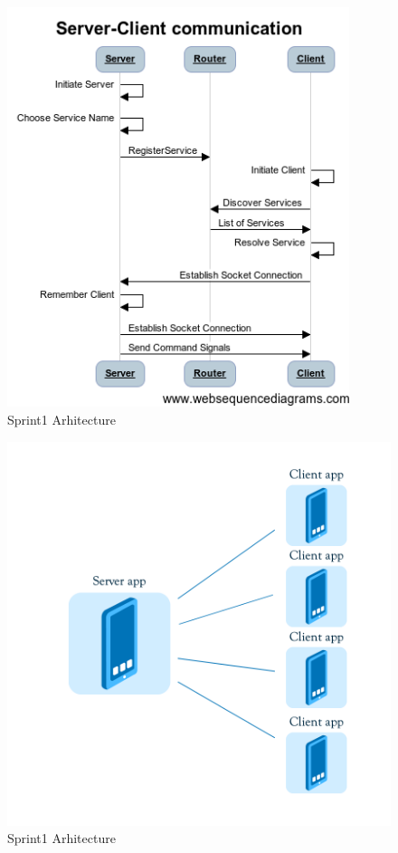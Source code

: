 \begin{figure}[!t]
	\centering
		\includegraphics[width=10cm]{sprint1/Server-Client communication.png}
	\caption{Sprint1 Arhitecture}
	\label{fig:sprint1_arhitecture}
\end{figure}


\begin{figure}[!t]
	\centering
		\includegraphics[width=16cm]{sprint1/arhitecture.png}
	\caption{Sprint1 Arhitecture}
	\label{fig:sprint1_arhitecture}
\end{figure}

